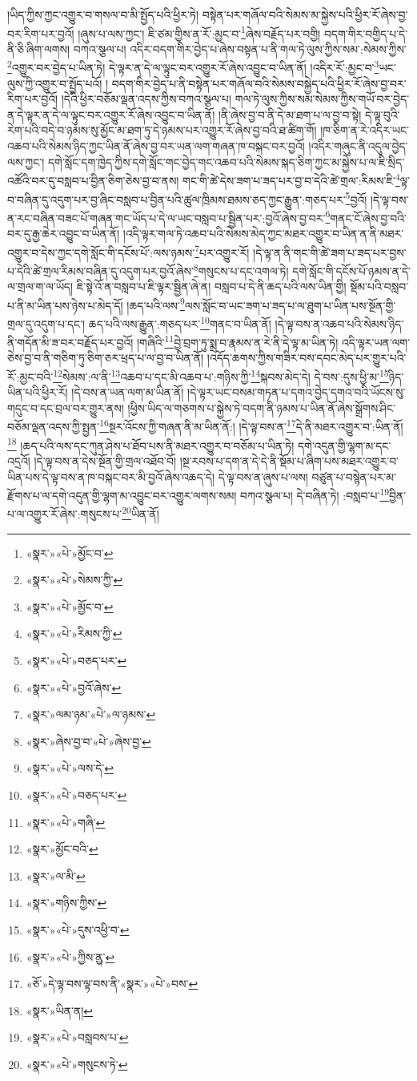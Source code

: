 །ཡིད་ཀྱིས་ཀྱང་འགྱུར་བ་གསལ་བ་མི་སྤྱོད་པའི་ཕྱིར་ཏེ། བསྟེན་པར་གཞོལ་བའི་སེམས་མ་སྐྱེས་པའི་ཕྱིར་རོ་ཞེས་བྱ་བར་རིག་པར་བྱའོ། །ཞུས་པ་ལས་ཀྱང་། ཇི་ཙམ་གྱིས་ན་རོ་:མྱང་བ་\footnote{«སྣར་»«པེ་»མྱོང་བ་}ཞེས་བརྗོད་པར་བགྱི། བདག་གིར་བགྱིད་པ་དེ་ནི་ཅི་ཞིག་ལགས། བཀའ་སྩལ་པ། འདིར་བདག་གིར་བྱེད་པ་ཞེས་བསྟན་པ་ནི་གལ་ཏེ་ལུས་ཀྱིས་སམ་:སེམས་ཀྱིས་\footnote{«སྣར་»«པེ་»སེམས་ཀྱི་}འགྱུར་བར་བྱེད་པ་ཡིན་ཏེ། དེ་ལྟར་ན་དེ་ལ་ལྟུང་བར་འགྱུར་རོ་ཞེས་འབྱུང་བ་ཡིན་ནོ། །འདིར་རོ་:མྱང་བ་\footnote{«སྣར་»«པེ་»མྱོང་བ་}ཡང་ལུས་ཀྱི་འགྱུར་བ་སྤྱོད་པའོ། །
བདག་གིར་བྱེད་པ་ནི་བསྟེན་པར་གཞོལ་བའི་སེམས་བསྐྱེད་པའི་ཕྱིར་རོ་ཞེས་བྱ་བར་རིག་པར་བྱའོ། །དེའི་ཕྱིར་བཅོམ་ལྡན་འདས་ཀྱིས་བཀའ་སྩལ་པ། གལ་ཏེ་ལུས་ཀྱིས་སམ་སེམས་ཀྱིས་གཡོ་བར་བྱེད་ན་དེ་ལྟར་ན་དེ་ལ་ལྟུང་བར་འགྱུར་རོ་ཞེས་འབྱུང་བ་ཡིན་ནོ། །ནི་ཞེས་བྱ་བ་ནི་དེ་མ་ཐག་པ་ལ་བྱ་བ་སྟེ། དེ་ལྟ་བུའི་རེག་པའི་བདེ་བ་ཉམས་སུ་མྱོང་མ་ཐག་ཏུ་དེ་ཉམས་པར་འགྱུར་རོ་ཞེས་བྱ་བའི་ཐ་ཚིག་གོ། །ཁ་ཅིག་ན་རེ་འདིར་ཡང་འཆབ་པའི་སེམས་ཉིད་ཀྱང་ཡིན་ནོ་ཞེས་བྱ་བར་ཡན་ལག་གཞན་ཁ་བསྐང་བར་བྱའོ། །འདིར་གཞུང་ནི་འདུལ་བྱེད་ལས་ཀྱང་། དགེ་སློང་དག་ཁྱེད་ཀྱིས་དགེ་སློང་གང་བྱེད་གང་འཆབ་པའི་སེམས་སྐད་ཅིག་ཀྱང་མ་སྐྱེས་པ་ལ་ཇི་སྲིད་འཚོའི་བར་དུ་བསླབ་པ་བྱིན་ཅིག་ཅེས་བྱ་བ་ནས། གང་གི་ཚེ་དེས་ཟག་པ་ཟད་པར་བྱ་བ་དེའི་ཚེ་གྲལ་:རིམས་ཇི་\footnote{«སྣར་»«པེ་»རིམས་ཀྱི་}ལྟ་བ་བཞིན་དུ་འདུག་པར་བྱ་ཞིང་བསླབ་པ་བྱིན་པའི་ཚུལ་ཁྲིམས་ཐམས་ཅད་ཀྱང་རྒྱུན་:གཅད་པར་\footnote{«སྣར་»«པེ་»བཅད་པར་}བྱའོ། །དེ་ལྟ་བས་ན་རང་བཞིན་བཟང་པོ་གཞན་གང་ཡོད་པ་དེ་ལ་ཡང་བསླབ་པ་སྦྱིན་པར་:བྱའོ་ཞེས་བྱ་བར་\footnote{«སྣར་»«པེ་»བྱའོ་ཞེས་}གནང་ངོ་ཞེས་བྱ་བའི་བར་དུ་རྒྱ་ཆེར་འབྱུང་བ་ཡིན་ནོ། །འདི་ལྟར་གལ་ཏེ་འཆབ་པའི་སེམས་མེད་ཀྱང་མཐར་འགྱུར་བ་ཡིན་ན་ནི་མཐར་འགྱུར་བ་དེས་ཀྱང་དགེ་སློང་གི་དངོས་པོ་:ལས་ཉམས་\footnote{«སྣར་»ལམ་ཉམ་«པེ་»ལ་ཉམས་}པར་འགྱུར་རོ། །དེ་ལྟ་ན་ནི་གང་གི་ཚེ་ཟག་པ་ཟད་པར་བྱས་པ་དེའི་ཚེ་གྲལ་རིམས་བཞིན་དུ་འདུག་པར་བྱའོ་ཞེས་\footnote{«སྣར་»ཞེས་བྱ་བ་«པེ་»ཞེས་བྱ་}གསུངས་པ་དང་འགལ་ཏེ། དགེ་སློང་གི་དངོས་པོ་ཉམས་ན་དེ་ལ་གྲལ་ག་ལ་ཡོད། ཇི་སྟེ་འོ་ན་བསླབ་པ་ཇི་ལྟར་སྦྱིན་ཞེ་ན། བསླབ་པ་དེ་ནི་ཆད་པའི་ལས་ཡིན་གྱི། སྡོམ་པའི་བསླབ་པ་ནི་མ་ཡིན་པས་ཉེས་པ་མེད་དོ། །ཆད་པའི་ལས་\footnote{«སྣར་»«པེ་»ལས་དེ་}ལས་སློང་བ་ཡང་ཟག་པ་ཟད་པ་ལ་ཐུག་པ་ཡིན་པས་སྔོན་གྱི་གྲལ་དུ་འདུག་པ་དང་། ཆད་པའི་ལས་རྒྱུན་:གཅད་པར་\footnote{«སྣར་»«པེ་»བཅད་པར་}གནང་བ་ཡིན་ནོ། །དེ་ལྟ་བས་ན་འཆབ་པའི་སེམས་ཉིད་ནི་གདོན་མི་ཟ་བར་བརྗོད་པར་བྱའོ། །གཞིའི་\footnote{«སྣར་»«པེ་»གཞི་}བྱེ་བྲག་ཏུ་སྨྲ་བ་རྣམས་ན་རེ་ནི་དེ་ལྟ་མ་ཡིན་ཏེ། འདི་ལྟར་ཡན་ལག་ཅེས་བྱ་བ་ནི་གཅིག་ཏུ་ཅིག་ཅར་ཕྲད་པ་ལ་བྱ་བ་ཡིན་ནོ། །འདོད་ཆགས་ཀྱིས་གཟིར་བས་དབང་མེད་པར་གྱུར་པའི་རོ་:མྱང་བའི་\footnote{«སྣར་»མྱོང་བའི་}སེམས་:ལ་ནི་\footnote{«སྣར་»ལ་མི་}འཆབ་པ་དང་མི་འཆབ་པ་:གཉིས་ཀྱི་\footnote{«སྣར་»གཉིས་ཀྱིས་}སྐབས་མེད་དེ། དེ་བས་:དུས་ཕྱི་མ་\footnote{«སྣར་»«པེ་»དུས་འཕྱི་བ་}ཉིད་ཡིན་པའི་ཕྱིར་རོ། །དེ་བས་ན་ཡན་ལག་མ་ཡིན་ནོ། །དེ་ལྟར་ཡང་བསམ་གཏན་པ་དགའ་བྱེད་དགའ་བའི་ཡོངས་སུ་གདུང་བ་དང་བྲལ་བར་གྱུར་ནས། །ཕྱིས་ཡིད་ལ་གཅགས་པ་སྐྱེས་ཏེ་བདག་ནི་ཉམས་པ་ཡིན་ནོ་ཞེས་སྒྲོགས་ཤིང་བཅོམ་ལྡན་འདས་ཀྱི་སྤྱན་\footnote{«སྣར་»«པེ་»ཀྱིས་ྱན་}སྔར་འོངས་ཀྱི་གཞན་ནི་མ་ཡིན་ནོ:། །དེ་ལྟ་བས་ན་\footnote{«ཅོ་»དེ་ལྟ་བས་ལྟ་བས་ནི་«སྣར་»«པེ་»བས་}དེ་ནི་མཐར་འགྱུར་བ་:ཡིན་ནོ།\footnote{«སྣར་»ཡིན་ན།} །ཆད་པའི་ལས་དང་ཀུན་ཤེས་པ་ཐོབ་པས་ནི་མཐར་འགྱུར་བ་བཅོམ་པ་ཡིན་ཏེ། དགེ་འདུན་གྱི་ལྷག་མ་དང་འདྲའོ། །དེ་ལྟ་བས་ན་དེས་སྔོན་གྱི་གྲལ་འཐོབ་བོ། །སྔ་རབས་པ་དག་ན་དེ་དེ་ནི་སྡོམ་པ་ཞིག་པས་མཐར་འགྱུར་བ་ཡིན་པས་དེ་ལྟ་བས་ན་ཁ་བསྐང་བར་མི་བྱའོ་ཞེས་འཆད་དེ། དེ་ལྟ་བས་ན་ཞུས་པ་ལས། བཙུན་པ་བསྙེན་པར་མ་རྫོགས་པ་ལ་དགེ་འདུན་གྱི་ལྷག་མ་འབྱུང་བར་འགྱུར་ལགས་སམ། བཀའ་སྩལ་པ། དེ་བཞིན་ཏེ། :བསླབ་པ་\footnote{«སྣར་»«པེ་»བསླབས་པ་}བྱིན་པ་ལ་འགྱུར་རོ་ཞེས་:གསུངས་པ་\footnote{«སྣར་»«པེ་»གསུངས་ཏེ་}ཡིན་ནོ། 